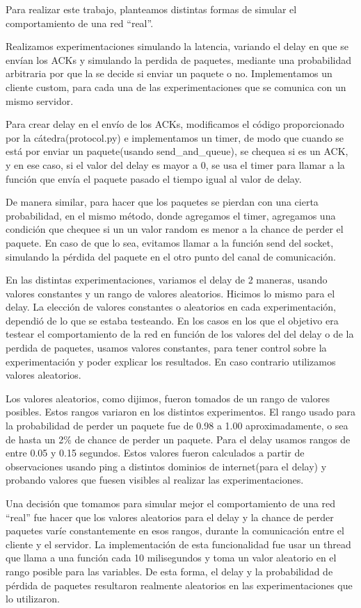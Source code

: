 Para realizar este trabajo, planteamos distintas formas de simular el comportamiento de una red “real”.
 
Realizamos experimentaciones simulando la latencia, variando el delay en que se envían los ACKs y simulando la perdida de paquetes, mediante una probabilidad arbitraria por que la se decide si enviar un paquete o no. Implementamos un cliente custom, para cada una de las experimentaciones que se comunica con un mismo servidor.

Para crear delay en el envío de los ACKs, modificamos el código proporcionado por la cátedra(protocol.py) e implementamos un timer, de modo que cuando se está por enviar un paquete(usando send\_and\_queue), se chequea si es un ACK, y en ese caso, si el valor del delay es mayor a 0, se usa el timer para llamar a la función que envía el paquete pasado el tiempo igual al valor de delay.

De manera similar, para hacer que los paquetes se pierdan con una cierta probabilidad, en el mismo método, donde agregamos el timer, agregamos una condición que chequee si un un valor random es menor a la chance de perder el paquete. En caso de que lo sea, evitamos llamar a la función send del socket, simulando la pérdida del paquete en el otro punto del canal de comunicación.

En las distintas experimentaciones, variamos el delay de 2 maneras, usando valores constantes y un rango de valores aleatorios. Hicimos lo mismo para el delay. 
La elección de valores constantes o aleatorios en cada experimentación, dependió de lo que se estaba testeando. En los casos en los que el objetivo era testear el comportamiento de la red en función de los valores del del delay o de la perdida de paquetes, usamos valores constantes, para tener control sobre la experimentación y poder explicar los resultados. En caso contrario utilizamos valores aleatorios.

Los valores aleatorios, como dijimos, fueron tomados de un rango de valores posibles. Estos rangos variaron en los distintos experimentos. El rango usado para la probabilidad de perder un paquete fue de 0.98 a 1.00 aproximadamente, o sea de hasta un 2\% de chance de perder un paquete. Para el delay usamos rangos de entre 0.05 y 0.15 segundos. Estos valores fueron calculados a partir de observaciones usando ping a distintos dominios de internet(para el delay) y probando valores que fuesen visibles al realizar las experimentaciones.

Una decisión que tomamos para simular mejor el comportamiento de una red “real” fue hacer que los valores aleatorios para el delay y la chance de perder paquetes varíe constantemente en esos rangos, durante la comunicación entre el cliente y el servidor. La implementación de esta funcionalidad fue usar un thread que llama a una función cada 10 milisegundos y toma un valor aleatorio en el rango posible para las variables. De esta forma, el delay y la probabilidad de pérdida de paquetes resultaron realmente aleatorios en las experimentaciones que lo utilizaron.

